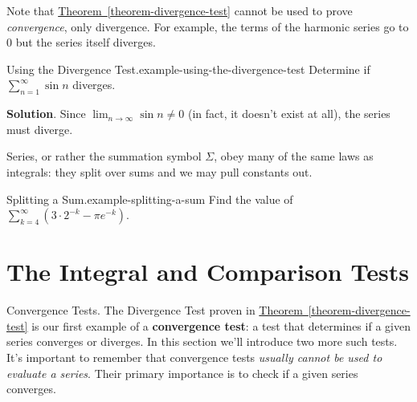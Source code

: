 \documentclass[10pt,]{book}
\newcommand{\terminology}[1]{\textbf{#1}}
\numberwithin{equation}{section}
\begin{document}
\hypertarget{p-866}{}%
Note that \hyperref[theorem-divergence-test]{Theorem~\ref{theorem-divergence-test}} cannot be used to prove \emph{convergence}, only divergence. For example, the terms of the harmonic series go to \(0\) but the series itself diverges.%
\begin{example}{Using the Divergence Test.}{example-using-the-divergence-test}%
\hypertarget{p-867}{}%
Determine if \(\sum_{n=1}^{\infty}\sin n\) diverges.%
\par\smallskip%
\noindent\textbf{Solution}.\hypertarget{solution-180}{}\quad%
\hypertarget{p-868}{}%
Since \(\lim_{n\to\infty}\sin n\neq 0\) (in fact, it doesn't exist at all), the series must diverge.%
\end{example}
\hypertarget{p-869}{}%
Series, or rather the summation symbol \(\Sigma\), obey many of the same laws as integrals: they split over sums and we may pull constants out.%
\begin{example}{Splitting a Sum.}{example-splitting-a-sum}%
\hypertarget{p-870}{}%
Find the value of \(\sum_{k=4}^{\infty}\left(3\cdot2^{-k} - \pi e^{-k}\right)\).%
\end{example}
%
%
\typeout{************************************************}
\typeout{************************************************}
%
\section[{The Integral and Comparison Tests}]{The Integral and Comparison Tests}\label{section-the-integral-and-comparison-tests}
\begin{introduction}{Convergence Tests.}%
\hypertarget{p-871}{}%
The Divergence Test proven in \hyperref[theorem-divergence-test]{Theorem~\ref{theorem-divergence-test}} is our first example of a \terminology{convergence test}: a test that determines if a given series converges or diverges. In this section we'll introduce two more such tests. It's important to remember that convergence tests \emph{usually cannot be used to evaluate a series}. Their primary importance is to check if a given series converges.%
\end{introduction}%
%
%
\typeout{************************************************}
\typeout{************************************************}
%
\end{document}
